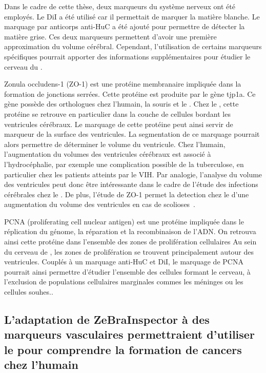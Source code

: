 \documentclass[\main/main.tex]{subfiles}
\begin{document}
%
Dans le cadre de cette thèse, deux marqueurs du système nerveux ont été employés.
%
Le DiI a été utilisé car il permettait de marquer la matière blanche.
%
Le marquage par anticorps anti-HuC a été ajouté pour permettre de détecter la matière grise.
%
Ces deux marqueurs permettent d'avoir une première approximation du volume cérébral.
%
Cependant, l'utilisation de certains marqueurs spécifiques pourrait apporter des informations supplémentaires pour étudier le cerveau du \pz{}.

%
Zonula occludens-1 (ZO-1) est une protéine membranaire impliquée dans la formation de jonctions serrées.
%
Cette protéine est produite par le gène tjp1a.
%
Ce gène possède des orthologues chez l'humain, la souris et le \pz{}.
%
Chez le \pz{}, cette protéine se retrouve en particulier dans la couche de cellules bordant les ventricules cérébraux.
%
Le marquage de cette protéine peut ainsi servir de marqueur de la surface des ventricules.
%
La segmentation de ce marquage pourrait alors permettre de déterminer le volume du ventricule.
%
Chez l'humain, l'augmentation du volumes des ventricules cérébraux est associé à l'hydrocéphalie, par exemple une complication possible de la tuberculose, en particulier chez les patients atteints par le VIH.
%
Par analogie, l'analyse du volume des ventricules peut donc être intéressante dans le cadre de l'étude des infections cérébrales chez le \pz{}.
%
De plus, l'étude de ZO-1 permet la detection chez le \pz{} d'une augmentation du volume des ventricules en cas de scolioses~\cite{vesque_2019}.

PCNA (proliferating cell nuclear antigen) est une protéine impliquée dans le réplication du génome, la réparation et la recombinaison de l'ADN.
%
On retrouva ainsi cette protéine dans l'ensemble des zones de prolifération cellulaires
%
Au sein du cerveau de \pz{}, les zones de prolifération se trouvent principalement autour des ventricules.
%
Couplés à un marquage anti-HuC et DiI, le marquage de PCNA pourrait ainsi permettre d'étudier l'ensemble des cellules formant le cerveau, à l'exclusion de populations cellulaires marginales commes les méninges ou les cellules souhes..

    \subsection{
    \label{chap:bio:marqueurs:vasc}
    L'adaptation de ZeBraInspector à des marqueurs vasculaires permettraient d'utiliser le \pz{} pour comprendre la formation de cancers chez l'humain
    }
\end{document}
